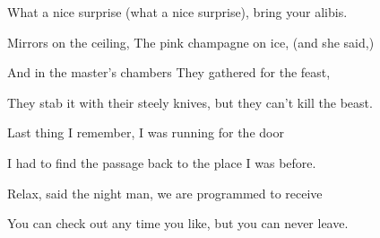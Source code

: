 What a nice surprise (what a nice surprise),
bring your alibis.
\kr

\zs
Mirrors on the ceiling,
The pink champagne on ice, (and she said,)


And in the master's chambers
They gathered for the feast,

They stab it with their steely knives,
but they can't kill the beast.
\ks

\zs
Last thing I remember,
I was running for the door

I had to find the passage
back to the place I was before.

Relax, said the night man,
we are programmed to receive

You can check out any time you like,
but you can never leave.
\ks

\kp






















